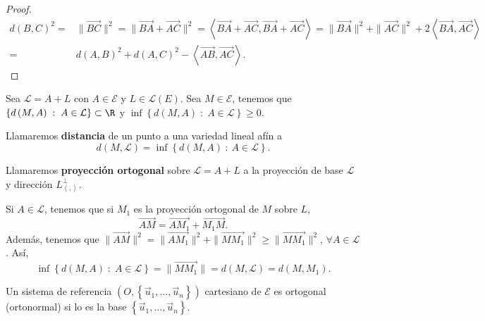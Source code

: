 \begin{proof}
\[
\begin{split}
	d\left(B,C\right)^{2} = & \|\overrightarrow{BC}\|^{2} = \|\overrightarrow{BA}+\overrightarrow{AC}\|^{2} = \left\langle \overrightarrow{BA} + \overrightarrow{AC}, \overrightarrow{BA}+\overrightarrow{AC} \right\rangle = \|\overrightarrow{BA}\|^{2} + \|\overrightarrow{AC}\|^{2} + 2\left\langle \overrightarrow{BA}, \overrightarrow{AC} \right\rangle \\
	= & d\left(A,B\right)^{2} + d\left(A,C\right)^{2}-\left\langle \overrightarrow{AB}, \overrightarrow{AC} \right\rangle  .
\end{split}
\]
\end{proof}
\begin{observation}
	\normalfont Sea $\displaystyle \mathcal{L} = A + L $ con $\displaystyle A \in \mathcal{E} $ y $\displaystyle L \in \mathcal{L}\left(E\right) $. Sea $\displaystyle M \in \mathcal{E} $, tenemos que $\displaystyle \left\{ d\left(M,A\right) \; : \; A \in \mathcal{L}\right\} \subset \R $ y $\displaystyle \inf \left\{ d\left(M,A\right) \; : \; A \in \mathcal{L}\right\} \geq 0 $.
\end{observation}
\begin{fdefinition}
\normalfont Llamaremos \textbf{distancia} de un punto a una variedad lineal afín a
\[ d\left(M, \mathcal{L}\right) = \inf \left\{ d\left(M,A\right) \: : \: A \in \mathcal{L}\right\}  .\]
\end{fdefinition}
\begin{fdefinition}
\normalfont Llamaremos \textbf{proyección ortogonal} sobre $\displaystyle \mathcal{L} = A + L $ a la proyección de base $\displaystyle \mathcal{L} $ y dirección $\displaystyle L^{\perp }_{\left\langle ,  \right\rangle } $.
\end{fdefinition}
\begin{observation}
\normalfont Si $\displaystyle A \in \mathcal{L} $, tenemos que si $\displaystyle M_{1} $ es la proyección ortogonal de $\displaystyle M $ sobre $\displaystyle L $, 
\[ \overrightarrow{AM} = \overrightarrow{AM_{1}} + \overrightarrow{M_{1}M} .\]
Además, tenemos que $\displaystyle \|\overrightarrow{AM}\|^{2} = \|\overrightarrow{AM_{1}}\|^{2} + \|\overrightarrow{MM_{1}}\|^{2} \geq \|\overrightarrow{MM_{1}}\|^{2} $, $\displaystyle \forall A \in \mathcal{L} $. Así, 
\[ \inf \left\{ d\left(M,A\right) \; : \; A \in \mathcal{L}\right\} = \|\overrightarrow{MM_{1}}\| = d\left(M, \mathcal{L}\right) = d\left(M,M_{1}\right) .\]
\end{observation}
\begin{fdefinition}[]
	\normalfont Un sistema de referencia $\displaystyle \left(O, \left\{ \vec{u}_{1}, \ldots, \vec{u}_{n}\right\} \right) $ cartesiano de $\displaystyle \mathcal{E} $ es ortogonal (ortonormal) si lo es la base $\displaystyle \left\{ \vec{u}_{1}, \ldots, \vec{u}_{n}\right\}  $.
\end{fdefinition}
